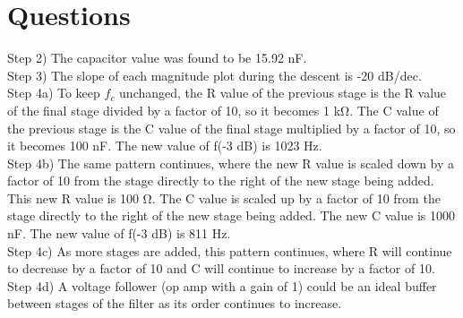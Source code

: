 \documentclass[CMPE]{KGCOEReport}
\begin{document}
\section*{Questions}

Step 2) The capacitor value was found to be 15.92 nF. \\

Step 3) The slope of each magnitude plot during the descent is -20 dB/dec.  \\

Step 4a) To keep $f_c$ unchanged, the R value of the previous stage is the R value of the final stage divided by a factor of 10, so it becomes 1 \si{\kilo\ohm}. The C value of the previous stage is the C value of the final stage multiplied by a factor of 10, so it becomes 100 nF. The new value of f(-3 dB) is 1023 Hz. \\

Step 4b) The same pattern continues, where the new R value is scaled down by a factor of 10 from the stage directly to the right of the new stage being added. This new R value is 100 \si{\ohm}. The C value is scaled up by a factor of 10 from the stage directly to the right of the new stage being added. The new C value is 1000 nF. The new value of f(-3 dB) is 811 Hz. \\

Step 4c) As more stages are added, this pattern continues, where R will continue to decrease by a factor of 10 and C will continue to increase by a factor of 10. \\

Step 4d) A voltage follower (op amp with a gain of 1) could be an ideal buffer between stages of the filter as its order continues to increase.

\newpage

\end{document}
